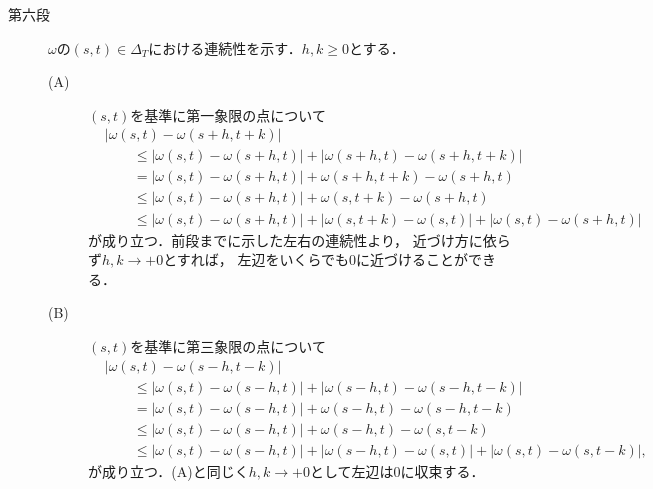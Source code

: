 \begin{prf}
\begin{description}
			\item[第六段]
				$\omega$の$(s,t) \in \Delta_T$における連続性を示す．$h,k \geq 0$とする．
				\begin{description}
					\item[(A)] $(s,t)$を基準に第一象限の点について
						\begin{align}
							&|\omega(s,t) - \omega(s+h,t+k)| \\
							&\qquad\leq |\omega(s,t) - \omega(s+h,t)| + |\omega(s+h,t) - \omega(s+h,t+k)| \\
							&\qquad= |\omega(s,t) - \omega(s+h,t)| + \omega(s+h,t+k) - \omega(s+h,t) \\
							&\qquad\leq |\omega(s,t) - \omega(s+h,t)| + \omega(s,t+k) - \omega(s+h,t) \\
							&\qquad\leq |\omega(s,t) - \omega(s+h,t)| + |\omega(s,t+k) - \omega(s,t)| + |\omega(s,t) - \omega(s+h,t)|
						\end{align}
						が成り立つ．前段までに示した左右の連続性より，
						近づけ方に依らず$h,k \longrightarrow +0$とすれば，
						左辺をいくらでも0に近づけることができる．
					
					\item[(B)] $(s,t)$を基準に第三象限の点について
						\begin{align}
							&|\omega(s,t) - \omega(s-h,t-k)| \\
							&\qquad\leq |\omega(s,t) - \omega(s-h,t)| + |\omega(s-h,t) - \omega(s-h,t-k)| \\
							&\qquad= |\omega(s,t) - \omega(s-h,t)| + \omega(s-h,t) - \omega(s-h,t-k) \\
							&\qquad\leq |\omega(s,t) - \omega(s-h,t)| + \omega(s-h,t) - \omega(s,t-k) \\
							&\qquad\leq |\omega(s,t) - \omega(s-h,t)| + |\omega(s-h,t) - \omega(s,t)| + |\omega(s,t) - \omega(s,t-k)|,
						\end{align}
						が成り立つ．(A)と同じく$h,k \longrightarrow +0$として左辺は0に収束する．
						

\end{description}
\end{description}
\end{prf}
